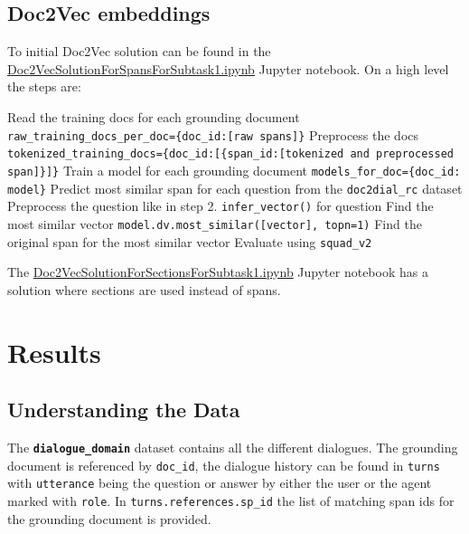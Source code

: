 \documentclass[11pt]{article}
\begin{document}
    \subsection{Doc2Vec embeddings}\label{subsec:doc2vec-experiment}
    To initial Doc2Vec solution can be found in the \href{https://github.com/isabelladegen/nlp-2021/blob/main/notebooks/Doc2VecSolutionForSpansForSubtask1.ipynb}{Doc2VecSolutionForSpansForSubtask1.ipynb}
    Jupyter notebook.
    On a high level the steps are:
    \begin{outline}[enumerate]
        \1 Read the training docs for each grounding document \texttt{raw\_training\_docs\_per\_doc=\{doc\_id:[raw spans]\}}
        \1 Preprocess the docs \texttt{tokenized\_training\_docs=\{doc\_id:[\{span\_id:[tokenized and preprocessed span]\}]\}}
        \1 Train a model for each grounding document \texttt{models\_for\_doc=\{doc\_id: model\}}
        \1 Predict most similar span for each question from the \texttt{doc2dial\_rc} dataset
        \2 Preprocess the question like in step 2.
        \2 \texttt{infer\_vector()} for question
        \2 Find the most similar vector \texttt{model.dv.most\_similar([vector], topn=1)}
        \2 Find the original span for the most similar vector
        \1 Evaluate using \texttt{squad\_v2}
    \end{outline}

    The \href{https://github.com/isabelladegen/nlp-2021/blob/main/notebooks/Doc2VecSolutionForSectionsForSubtask1.ipynb}{Doc2VecSolutionForSectionsForSubtask1.ipynb}
    Jupyter notebook has a solution where sections are used instead of spans.


    \section{Results}\label{sec:results}

    \subsection{Understanding the Data}\label{subsec:understanding-the-data-results}

    The \textbf{\texttt{dialogue\_domain}} dataset contains all the different dialogues. The grounding document is referenced
    by \texttt{doc\_id}, the dialogue history can be found in \texttt{turns} with \texttt{utterance} being the question
    or answer by either the user or the agent marked with \texttt{role}. In \texttt{turns.references.sp\_id} the list of
    matching span ids for the grounding document is provided.
\end{document}
